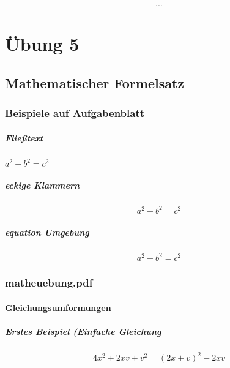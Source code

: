 \documentclass[12pt]{report}
\begin{document}
\[ \cdots \]


\chapter{Übung 5}

\section{Mathematischer Formelsatz}

\subsection{Beispiele auf Aufgabenblatt}

\paragraph{Fließtext}
$a^2 + b^2 = c^2$

\paragraph{eckige Klammern}
\[ a^2 + b^2 = c^2 \]

\paragraph{equation Umgebung}
\begin{equation}
a^2 + b^2 = c^2
\end{equation}


\subsection{matheuebung.pdf}

\subsubsection{Gleichungsumformungen}

\paragraph{Erstes Beispiel (Einfache Gleichung}
\begin{equation}
4x^2 + 2xv + v^2 = (2x + v)^2 - 2xv
\end{equation}
\end{document}

